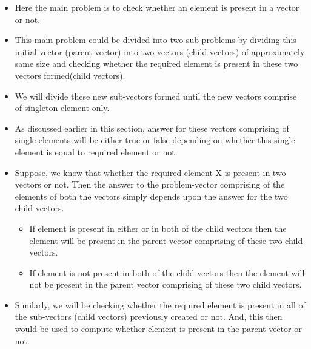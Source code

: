 \documentclass[conference]{IEEEtran}
\begin{document}
\begin{itemize}
\item Here the main problem is to check whether an element is present in a vector or not.
\item This main problem could be divided into two sub-problems by dividing this initial vector (parent vector) into two vectors (child vectors) of approximately same size and checking whether the required element is present in these two vectors formed(child vectors).
\item We will divide these new sub-vectors formed until the new vectors comprise of singleton element only.
\item As discussed earlier in this section, answer for these vectors comprising of single elements will be either true or false depending on whether this single element is equal to required element or not.
\item Suppose, we know that whether the required element X is present in two vectors or not. Then the answer to the problem-vector comprising of the elements of both the vectors simply depends upon the answer for the two child vectors.
\begin{itemize}
    \item If element is present in either or in both of the child vectors then the element will be present in the parent vector comprising of these two child vectors.
    \item If element is not present in both of the child vectors then the element will not be present in the parent vector comprising of these two child vectors.
\end{itemize}
\item Similarly, we will be checking whether the required element is present in all of the sub-vectors (child vectors) previously created or not. And, this then would be used to compute whether element is present in the parent vector or not.
\end{itemize}
\end{document}
